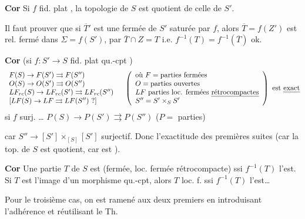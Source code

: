 \documentclass[11pt,a4paper]{article}
\begin{document}
\textbf{Cor} Si $f$ fid. plat , la topologie de $S$ est quotient de celle de $S'$. 


Il faut prouver que si $\overline{T}'$ est une fermée de $S'$ saturée par $f$, alors $\overline{T} = f(Z')$ est rel. fermé dans $\Sigma = f(S')$,  par $\overline{T} \cap Z = T$ i.e. $f^{-1}(T) = f^{-1}(\overline{T})$ \quad ok.

\textbf{Cor} (si $f : S' \to S$ fid. plat qu.-cpt )
\[
\begin{array}{l}
F(S) \to F(S') \rightrightarrows F(S'') \\
O(S) \to O(S') \rightrightarrows O(S'') \\
LF_{rc}(S) \to LF_{rc}(S') \rightrightarrows LF_{rc}(S'') \\
{}[LF(S) \to LF \rightrightarrows LF(S'')\ ?]
\end{array}
\quad
\left(\begin{array}{l}
\text{où } F = \text{parties fermées} \\
O = \text{parties ouvertes} \\
LF \text{ parties loc. fermées \uncertain{rétrocompactes}} \\
S'' = S' \times_S S'
\end{array}\right) \text{ est \emph{exact}}
\]
 si $f$ surj. … \quad $P(S) \to P(S') \rightrightarrows P(S'')$ \quad ($P =$ parties)


car $S'' \to [S'] \times_{[S]} [S']$ surjectif. Donc l'exactitude des   premières suites  (car la top. de $S$ est quotient, \struck{\ill{}} car est ).

\textbf{Cor} Une partie $T$ de $S$ est  (fermée, loc. fermée rétrocompacte) ssi $f^{-1}(T)$ l'est. Si $T$ est l'image d'un morphisme qu.-cpt, alors $T$ loc. f. ssi $f^{-1}(T)$ l'est…

Pour le troisième cas, on est ramené aux deux premiers en introduisant l'adhérence et réutilisant le Th.
\end{document}
